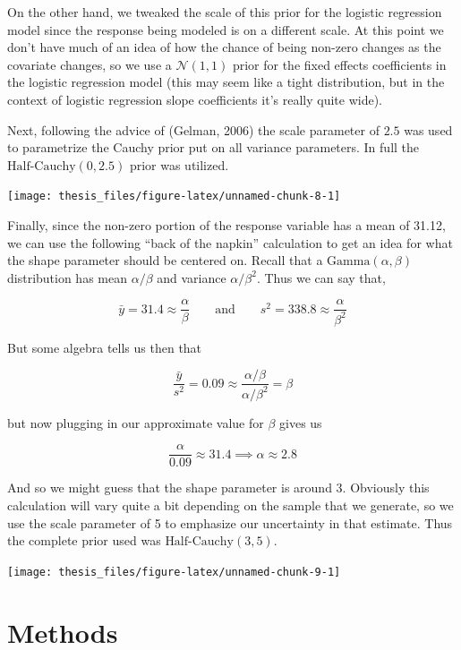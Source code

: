 \documentclass[12pt,twoside]{reedthesis}
\begin{document}
On the other hand, we tweaked the scale of this prior for the logistic regression model since the response being modeled is on a different scale. At this point we don't have much of an idea of how the chance of being non-zero changes as the covariate changes, so we use a \(\mathcal{N}(1,1)\) prior for the fixed effects coefficients in the logistic regression model (this may seem like a tight distribution, but in the context of logistic regression slope coefficients it's really quite wide).

Next, following the advice of (Gelman, 2006) the scale parameter of \(2.5\) was used to parametrize the Cauchy prior put on all variance parameters. In full the \(\text{Half-Cauchy}(0, 2.5)\) prior was utilized.
\begin{center}\texttt{[image: thesis\_files/figure-latex/unnamed-chunk-8-1]} \end{center}

Finally, since the non-zero portion of the response variable has a mean of 31.12, we can use the following ``back of the napkin'' calculation to get an idea for what the shape parameter should be centered on. Recall that a \(\text{Gamma}(\alpha, \beta)\) distribution has mean \(\alpha / \beta\) and variance \(\alpha / \beta^2\). Thus we can say that,

\[
\bar{y} = 31.4 \approx \frac{\alpha}{\beta}\qquad \text{and} \qquad s^2 = 338.8 \approx \frac{\alpha}{\beta^2}
\]

But some algebra tells us then that

\[
\frac{\bar{y}}{s^2} = 0.09 \approx \frac{\alpha / \beta}{\alpha / \beta^2} = \beta 
\]

but now plugging in our approximate value for \(\beta\) gives us

\[
\frac{\alpha}{0.09} \approx 31.4 \implies \alpha \approx 2.8
\]

And so we might guess that the shape parameter is around 3. Obviously this calculation will vary quite a bit depending on the sample that we generate, so we use the scale parameter of 5 to emphasize our uncertainty in that estimate. Thus the complete prior used was \(\text{Half-Cauchy}(3, 5)\).
\begin{center}\texttt{[image: thesis\_files/figure-latex/unnamed-chunk-9-1]} \end{center}

\hypertarget{methods}{%
\section{Methods}\label{methods}}
\end{document}

